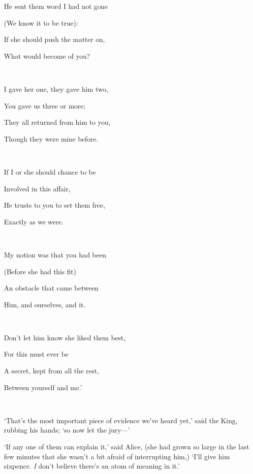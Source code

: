 \documentclass[12pt]{article}
\begin{document}
\begin{Parallel}[p]{}{}
{{\setlength{\parskip}{0em}
\par\quad He sent them word I had not gone
\par\quad\quad (We know it to be true):
\par\quad If she should push the matter on,
\par\quad\quad What would become of you?
}\\
\par

{\setlength{\parskip}{0em}
\par\quad I gave her one, they gave him two,
\par\quad\quad You gave us three or more;
\par\quad They all returned from him to you,
\par\quad\quad Though they were mine before.
}\\
\par

{\setlength{\parskip}{0em}
\par\quad If I or she should chance to be
\par\quad\quad Involved in this affair,
\par\quad He trusts to you to set them free,
\par\quad\quad Exactly as we were.
}\\
\par

{\setlength{\parskip}{0em}
\par\quad My notion was that you had been
\par\quad\quad (Before she had this fit)
\par\quad An obstacle that came between
\par\quad\quad Him, and ourselves, and it.
}\\
\par

{\setlength{\parskip}{0em}
\par\quad Don’t let him know she liked them best,
\par\quad\quad For this must ever be
\par\quad A secret, kept from all the rest,
\par\quad\quad Between yourself and me.’
}\\
\par

‘That’s the most important piece of evidence we’ve heard yet,’ said the King, rubbing his hands; ‘so now let the jury—’

‘If any one of them can explain it,’ said Alice, (she had grown so large in the last few minutes that she wasn’t a bit afraid of interrupting him,) ‘I’ll give him sixpence. \textit{I} don’t believe there’s an atom of meaning in it.’

}
\end{Parallel}
\end{document}
